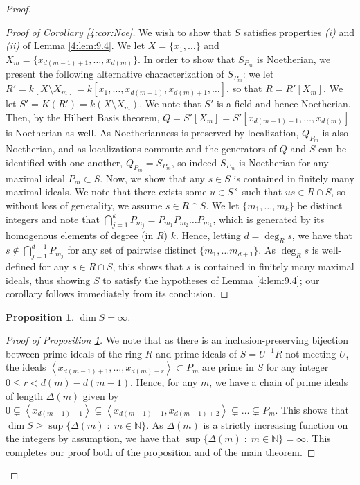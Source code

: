 \documentclass[Letter,12pt]{article}
\newcommand{\n}{\mathbb{N}}
\newcommand{\<}{\left\langle}
\renewcommand{\>}{\right\rangle}
\newcommand{\idl}[1]{\left\langle{#1}\right\rangle }
\newenvironment{subproof}[1][\proofname]{%
	\renewcommand{\qedsymbol}{$\blacksquare$}%
	\begin{proof}[#1]%
	}{%
	\end{proof}%
}
\newtheorem{prop}[theorem]{Proposition}
\theoremstyle{definition}
\begin{document}
\begin{proof}
\begin{subproof}[Proof of Corollary \ref{4:cor:Noe}]
			We wish to show that $S$ satisfies properties \textit{(i) }and\textit{ (ii)} of Lemma \ref{4:lem:9.4}. We let $X=\{x_1,\ldots\}$ and $X_m=\{x_{d(m-1)+1},\ldots,x_{d(m)}\}$. In order to show that $S_{P_m}$ is Noetherian, we present the following alternative characterization of $S_{P_m}$: we let $R'=k[X\setminus X_m]=k[x_1,\hdots,x_{d(m-1)},x_{d(m)+1},\ldots]$, so that $R=R'[X_m]$. We let $S'=K(R')=k(X\setminus X_m)$. We note that $S'$ is a field and hence Noetherian. Then, by the Hilbert Basis theorem, $Q=S'[X_m]=S'[x_{d(m-1)+1},\ldots, x_{d(m)}]$ is Noetherian as well. As Noetherianness is preserved by localization, $Q_{P_m}$ is also Noetherian, and as localizations commute and the generators of $Q$ and $S$ can be identified with one another, $Q_{P_m}=S_{P_m}$, so indeed $S_{P_m}$ is Noetherian for any maximal ideal $P_m\subset S$. Now, we show that any $s\in S$ is contained in finitely many maximal ideals. We note that there exists some $u\in S^\times$ such that $us\in R\cap S$, so without loss of generality, we assume $s\in R\cap S$. We let $\{m_1,\hdots,m_k\}$ be distinct integers and note that $\bigcap_{j=1}^kP_{m_j}=P_{m_1}P_{m_2}\ldots P_{m_k}$, which is generated by its homogenous elements of degree (in $R$) $k$. Hence, letting $d=\deg_Rs$, we have that $s\notin \bigcap_{j=1}^{d+1}P_{m_j}$ for any set of pairwise distinct $\{m_{1},\ldots m_{d+1}\}$. As $\deg_Rs$ is well-defined for any $s\in R\cap S$, this shows that $s$ is contained in finitely many maximal ideals, thus showing $S$ to satisfy the hypotheses of Lemma \ref{4:lem:9.4}; our corollary follows immediately from its conclusion.
		\end{subproof}
		
		\begin{prop}
			$\dim S=\infty$.\label{4:prop:final}
		\end{prop}
		\begin{subproof}[Proof of Proposition \ref{4:prop:final}]
			We note that as there is an inclusion-preserving bijection between prime ideals of the ring $R$ and prime ideals of $S=U^{-1}R$ not meeting $U$, the ideals $\idl{x_{d(m-1)+1},\ldots,x_{d(m)-r}}\subset P_m$ are prime in $S$ for any integer $0\leq r <d(m)-d(m-1)$. Hence, for any $m$, we have a chain of prime ideals of length $\Delta(m)$ given by $0\subsetneq \idl{x_{d(m-1)+1}}\subsetneq \idl{x_{d(m-1)+1},x_{d(m-1)+2}}\subsetneq \ldots\subsetneq P_m$. This shows that $\dim S\geq \sup\{\Delta(m)\;:\;m\in \n\}$. As $\Delta(m)$ is a strictly increasing function on the integers by assumption, we have that $\sup\{\Delta(m)\;:\;m\in \n\}=\infty$. This completes our proof both of the proposition and of the main theorem.
		\end{subproof}
	\end{proof}
	
\end{document}
